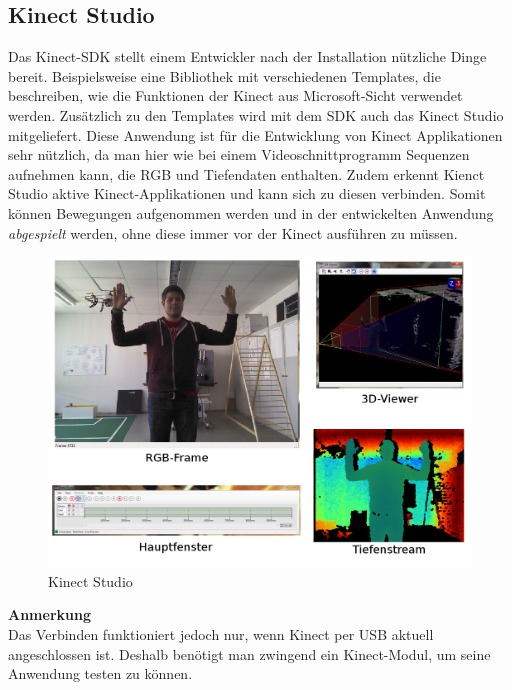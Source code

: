 \subsection{Kinect Studio}
Das Kinect-SDK stellt einem Entwickler nach der Installation nützliche Dinge bereit. Beispielsweise eine Bibliothek mit verschiedenen Templates, die beschreiben, wie die Funktionen der Kinect aus Microsoft-Sicht verwendet werden. Zusätzlich zu den Templates wird mit dem SDK auch das Kinect Studio mitgeliefert. Diese Anwendung ist für die Entwicklung von Kinect Applikationen sehr nützlich, da man hier wie bei einem Videoschnittprogramm Sequenzen aufnehmen kann, die RGB und Tiefendaten enthalten. Zudem erkennt Kienct Studio aktive Kinect-Applikationen und kann sich zu diesen verbinden. Somit können Bewegungen aufgenommen werden und in der entwickelten Anwendung \textit{abgespielt} werden, ohne diese immer vor der Kinect ausführen zu müssen.
\begin{figure}[H]						
	\centering							
	\includegraphics[scale=0.4]{Bilder/Kinect_Studio.png}			
	\caption{Kinect Studio}						
	\label{f:kinect_studio}						
\end{figure}
\noindent
\textbf{Anmerkung}\\
Das Verbinden funktioniert jedoch nur, wenn Kinect per USB aktuell angeschlossen ist. Deshalb benötigt man zwingend ein Kinect-Modul, um seine Anwendung testen zu können.